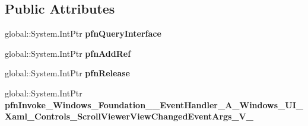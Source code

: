 \subsection*{Public Attributes}
\begin{DoxyCompactItemize}
\item 
\mbox{\label{struct_system_1_1_event_handler___a___windows___u_i___xaml___controls___scroll_viewer_view_changd9b2e3e9495d0e3c92d7a0d6cea8508d_a226d6c3898a04b05375d293ebde7499b}} 
global\+::\+System.\+Int\+Ptr {\bfseries pfn\+Query\+Interface}
\item 
\mbox{\label{struct_system_1_1_event_handler___a___windows___u_i___xaml___controls___scroll_viewer_view_changd9b2e3e9495d0e3c92d7a0d6cea8508d_af26eb4b82dab2093c2886844ce9e39d6}} 
global\+::\+System.\+Int\+Ptr {\bfseries pfn\+Add\+Ref}
\item 
\mbox{\label{struct_system_1_1_event_handler___a___windows___u_i___xaml___controls___scroll_viewer_view_changd9b2e3e9495d0e3c92d7a0d6cea8508d_abfb4ad72b4bc45d39628cf08f84c46df}} 
global\+::\+System.\+Int\+Ptr {\bfseries pfn\+Release}
\item 
\mbox{\label{struct_system_1_1_event_handler___a___windows___u_i___xaml___controls___scroll_viewer_view_changd9b2e3e9495d0e3c92d7a0d6cea8508d_a5d3c8a45a879164a4ecdced25c981e11}} 
global\+::\+System.\+Int\+Ptr {\bfseries pfn\+Invoke\+\_\+\+Windows\+\_\+\+Foundation\+\_\+\+\_\+\+Event\+Handler\+\_\+\+A\+\_\+\+Windows\+\_\+\+U\+I\+\_\+\+Xaml\+\_\+\+Controls\+\_\+\+Scroll\+Viewer\+View\+Changed\+Event\+Args\+\_\+\+V\+\_\+}
\end{DoxyCompactItemize}
